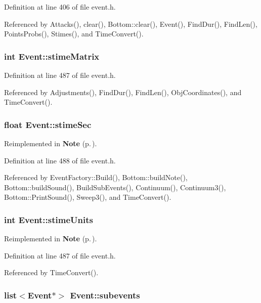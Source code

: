 Definition at line 406 of file event.h.

Referenced by Attacks(), clear(), Bottom::clear(), Event(), Find\-Dur(), Find\-Len(), Points\-Probs(), Stimes(), and Time\-Convert().
\subsubsection{\setlength{\rightskip}{0pt plus 5cm}int {\bf Event::stime\-Matrix}}\label{classEvent_o37}




Definition at line 487 of file event.h.

Referenced by Adjustments(), Find\-Dur(), Find\-Len(), Obj\-Coordinates(), and Time\-Convert().
\subsubsection{\setlength{\rightskip}{0pt plus 5cm}float {\bf Event::stime\-Sec}}\label{classEvent_o40}




Reimplemented in {\bf Note} {\rm (p.\,\pageref{classNote_r0})}.

Definition at line 488 of file event.h.

Referenced by Event\-Factory::Build(), Bottom::build\-Note(), Bottom::build\-Sound(), Build\-Sub\-Events(), Continuum(), Continuum3(), Bottom::Print\-Sound(), Sweep3(), and Time\-Convert().
\subsubsection{\setlength{\rightskip}{0pt plus 5cm}int {\bf Event::stime\-Units}}\label{classEvent_o38}




Reimplemented in {\bf Note} {\rm (p.\,\pageref{classNote_r1})}.

Definition at line 487 of file event.h.

Referenced by Time\-Convert().
\subsubsection{\setlength{\rightskip}{0pt plus 5cm}list$<${\bf Event}$\ast$$>$ {\bf Event::subevents}}\label{classEvent_o12}




